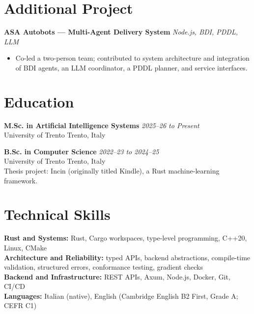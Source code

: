 \documentclass[10pt,a4paper]{article}
\begin{document}
\section{Additional Project}
\noindent\textbf{ASA Autobots --- Multi-Agent Delivery System} \hfill \textsl{Node.js, BDI, PDDL, LLM}\\
\begin{itemize}
  \item Co-led a two-person team; contributed to system architecture and integration of BDI agents, an LLM coordinator, a PDDL planner, and service interfaces.
\end{itemize}

\section{Education}
\noindent\textbf{M.Sc. in Artificial Intelligence Systems} \hfill \textsl{2025--26 to Present}\\
\noindent University of Trento \hfill Trento, Italy

\vspace{0.5ex}
\noindent\textbf{B.Sc. in Computer Science} \hfill \textsl{2022--23 to 2024--25}\\
\noindent University of Trento \hfill Trento, Italy \\
\noindent Thesis project: Incin (originally titled Kindle), a Rust machine-learning framework.

\section{Technical Skills}
\noindent\textbf{Rust and Systems:} Rust, Cargo workspaces, type-level programming, C++20, Linux, CMake\\
\textbf{Architecture and Reliability:} typed APIs, backend abstractions, compile-time validation, structured errors, conformance testing, gradient checks\\
\textbf{Backend and Infrastructure:} REST APIs, Axum, Node.js, Docker, Git, CI/CD\\
\textbf{Languages:} Italian (native), English (Cambridge English B2 First, Grade A; CEFR C1)
\end{document}
